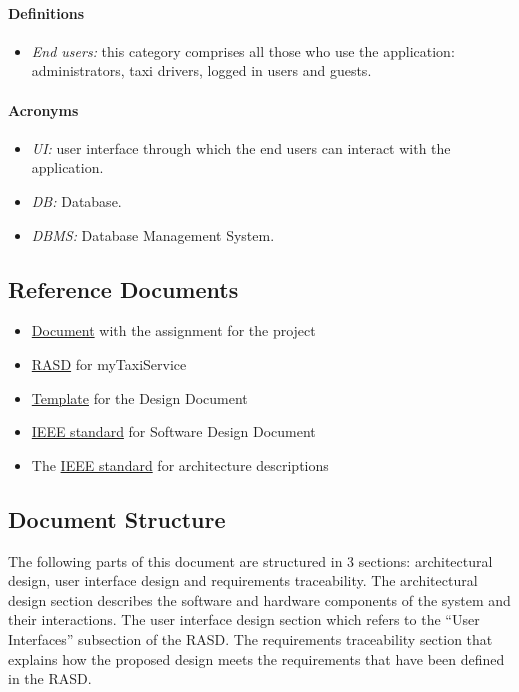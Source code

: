 \documentclass{article}
\begin{document}
\paragraph{Definitions}
\begin{itemize}
	\item \textit{End users:} this category comprises all those who use the application\footnotemark: administrators, taxi drivers, logged in users and guests.
\end{itemize}
\paragraph{Acronyms}
\begin{itemize}
	\item \textit{UI:} user interface through which the end users can interact with the application.
	\item \textit{DB:} Database.
	\item \textit{DBMS:} Database Management System.
\end{itemize}
\subsection{Reference Documents}
\begin{itemize}
	\item \href{run:./external_references/assignments.pdf}{Document} with the assignment for the project
	\item \href{run:./external_references/Rasd.pdf}{RASD} for myTaxiService
	\item \href{run:./external_references/DDTOC.pdf}{Template} for the Design Document
	\item \href{run:./external_references/IEEESoftwareDesignDescriptions.pdf}{IEEE standard} for Software Design Document
	\item The \href{run:./external_references/IEEEArchitectureDescription.pdf}{IEEE standard} for architecture descriptions
\end{itemize}
\subsection{Document Structure}
The following parts of this document are structured in 3 sections: architectural design, user interface design and requirements traceability. The architectural design section describes the software and hardware components of the system and their interactions. The user interface design section which refers to the ``User Interfaces'' subsection of the RASD\@. The requirements traceability section that explains how the proposed design meets the requirements that have been defined in the RASD\@.
\clearpage
\end{document}
